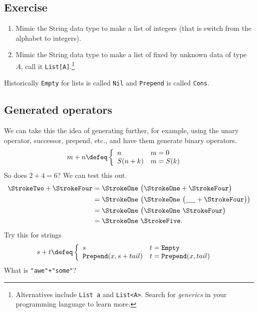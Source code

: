 \subsection*{Exercise}
\begin{enumerate}
    \item Mimic the String data type to make a list of integers (that is 
    switch from the alphabet to integers).

    \item Mimic the String data type to make a list of fixed by 
    unknown data of type $A$, call it \lstinline{List[A]}.\footnote{
    Alternatives include \lstinline{List a} and \lstinline{List<A>}. 
    Search for \emph{generics} in your programming language to learn more.
    }

\end{enumerate}
Historically \lstinline{Empty} for lists is called \lstinline{Nil} 
and \lstinline{Prepend} is called \lstinline{Cons}.

\subsection{Generated operators}
We can take this the idea of generating further, for example, using 
the unary operator, successor, prepend, etc., and have them generate 
binary operators.
\begin{align*}
    m+n & \defeq\left\{ 
    \begin{array}{ll}
        n & m = 0\\
        S(n+k) & m=S(k)
    \end{array}
    \right.
\end{align*}
So does $2+4=6$?  We can test this out.
\begin{align*}
    \text{\StrokeTwo}+\text{\StrokeFour} & = \text{\StrokeOne}~ \big(\text{\StrokeOne} +\text{\StrokeFour}\big)\\
    & = \text{\StrokeOne}~ \big( \text{\StrokeOne}~\big(\underline{\hspace{5mm}}+\StrokeFour\big)\big)\\
    & = \text{\StrokeOne}~ \big( \text{\StrokeOne}~\StrokeFour\big)\\
    & = \text{\StrokeOne}~ \text{\StrokeFive}.
\end{align*}
Try this for strings
\begin{align*}
    s+t & \defeq\left\{ 
    \begin{array}{ll}
        s & t = \texttt{Empty}\\
        \texttt{Prepend}(x,s+tail) & t=\texttt{Prepend}(x,tail)
    \end{array}
    \right.
\end{align*}
What is \lstinline{"awe"+"some"}?  

